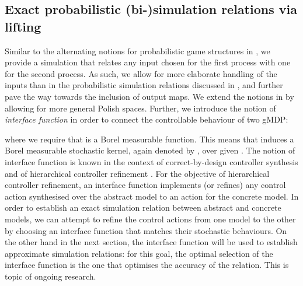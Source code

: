 \documentclass[letterpaper, 10 pt, conference]{amsart}
\theoremstyle{definition}
\theoremstyle{example}
\theoremstyle{remark}
\begin{document}
\subsection{Exact probabilistic (bi-)simulation relations via lifting} 
  
Similar to the alternating notions for probabilistic game structures in \cite{Zhang2010a}, 
we provide a simulation that relates any input chosen for the first process with one for the second process. 
As such, we allow for more elaborate handling of the inputs than in the probabilistic simulation relations discussed in \cite{Desharnais2008,cDAK12}, 
and further pave the way towards the inclusion of output maps.  
We extend the notions in \cite{Segala1995,Zhang2010a} by allowing for more general Polish spaces. 
Further, we introduce the notion of \emph{interface function} in order 
to connect the controllable behaviour of two gMDP:     

where we require that  is a Borel measurable function. 
This means that  induces a Borel measurable stochastic kernel, 
again denoted by , 
over  given .
The notion of interface function is known in the context of correct-by-design controller synthesis and of hierarchical controller refinement \cite{Girard2009,Tabuada2009b}.   
For the objective of hierarchical controller refinement, 
an interface function implements (or refines) any control action synthesised over the abstract model to an action for the concrete model. 
In order to establish an exact simulation relation between abstract and concrete models,  
we can attempt to refine the control actions from one model to the other by choosing an interface function that matches their stochastic behaviours.  
On the other hand in the next section, the interface function will be used to establish approximate simulation relations: 
for this goal, the optimal selection of the interface function is the one that optimises the accuracy of the relation.  
This is topic of ongoing research. 
\end{document}
